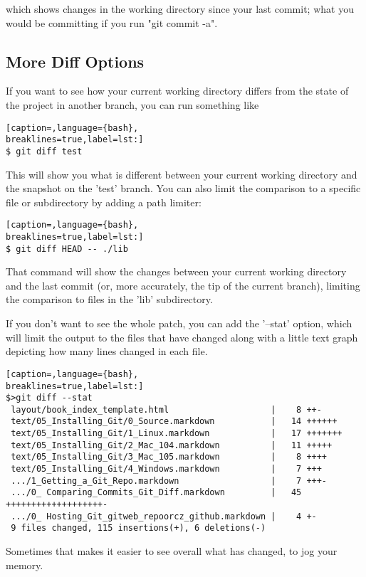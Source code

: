 which shows changes in the working directory since your last commit; what you
would be committing if you run "git commit -a".

\subsection{More Diff Options}
If you want to see how your current working directory differs from the state of
the project in another branch, you can run something like
\lstset{basicstyle=\scriptsize, numbers=none, captionpos=b, tabsize=4}
\begin{lstlisting}[caption=,language={bash},
breaklines=true,label=lst:]
$ git diff test
\end{lstlisting}

This will show you what is different between your current working directory and
the snapshot on the 'test' branch. You can also limit the comparison to a
specific file or subdirectory by adding a path limiter:
\lstset{basicstyle=\scriptsize, numbers=none, captionpos=b, tabsize=4}
\begin{lstlisting}[caption=,language={bash},
breaklines=true,label=lst:]
$ git diff HEAD -- ./lib 
\end{lstlisting}

That command will show the changes between your current working directory and
the last commit (or, more accurately, the tip of the current branch), limiting
the comparison to files in the 'lib' subdirectory.

If you don't want to see the whole patch, you can add the '--stat' option,
which will limit the output to the files that have changed along with a little
text graph depicting how many lines changed in each file.
\lstset{basicstyle=\scriptsize, numbers=none, captionpos=b, tabsize=4}
\begin{lstlisting}[caption=,language={bash},
breaklines=true,label=lst:]
$>git diff --stat
 layout/book_index_template.html                    |    8 ++-
 text/05_Installing_Git/0_Source.markdown           |   14 ++++++
 text/05_Installing_Git/1_Linux.markdown            |   17 +++++++
 text/05_Installing_Git/2_Mac_104.markdown          |   11 +++++
 text/05_Installing_Git/3_Mac_105.markdown          |    8 ++++
 text/05_Installing_Git/4_Windows.markdown          |    7 +++
 .../1_Getting_a_Git_Repo.markdown                  |    7 +++-
 .../0_ Comparing_Commits_Git_Diff.markdown         |   45 +++++++++++++++++++-
 .../0_ Hosting_Git_gitweb_repoorcz_github.markdown |    4 +-
 9 files changed, 115 insertions(+), 6 deletions(-)
\end{lstlisting}

Sometimes that makes it easier to see overall what has changed, to jog your
memory.
